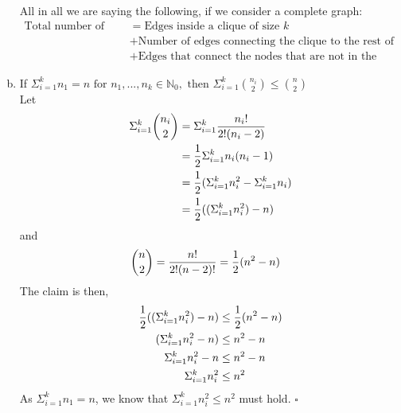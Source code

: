 \begin{enumerate}[a)]
\begin{enumerate}
\begin{center}
\begin{tikzpicture}
\end{tikzpicture}   
\end{center}
\end{enumerate}
All in all we are saying the following, if we consider a complete graph:
\begin{align*}
    \text{Total number of edges} &= \text{Edges inside a clique of size $k$} \\ &+ \text{Number of edges connecting the clique to the rest of the graph} \\ &+ \text{Edges that connect the nodes that are not in the clique}
\end{align*}
    
    \item If $\Sigma^k_{i=1}n_1 = n \text{ for } 
 n_1, ..., n_k \in \mathbb{N}_0, \text{ then } \Sigma^k_{i=1} \binom{n_i}{2} \leq \binom{n}{2}$ \\
 \linebreak 
 Let \begin{align}
 \notag
 \Sigma^k_{i=1} \binom{n_i}{2} & = \Sigma^k_{i=1} \frac{n_i!}{2!(n_i-2)} \\
 \notag
  & = \frac{1}{2}\Sigma^k_{i=1} n_i(n_i-1) \\
  \notag
  & = \frac{1}{2}(\Sigma^k_{i=1} n_i^2 - \Sigma^k_{i=1} n_i) \\
  & = \frac{1}{2}((\Sigma^k_{i=1} n_i^2) - n)
 \end{align}
and 
\begin{align}
\notag
    \binom{n}{2} & = \frac{n!}{2!(n-2)!} = \frac{1}{2}(n^2-n) 
\end{align}
The claim is then, 
\begin{align}
\notag
    \frac{1}{2}((\Sigma^k_{i=1} n_i^2) - n) &\leq \frac{1}{2}(n^2-n) \\
    \notag
    (\Sigma^k_{i=1} n_i^2 - n) &\leq n^2-n \\
    \notag
    \Sigma^k_{i=1} n_i^2 - n &\leq n^2-n \\
    \notag
    \Sigma^k_{i=1} n_i^2 &\leq n^2 
\end{align}
As $\Sigma^k_{i=1}n_1 = n$, we know that $\Sigma^k_{i=1} n_i^2 \leq n^2$ must hold. $\square$
\end{enumerate}
